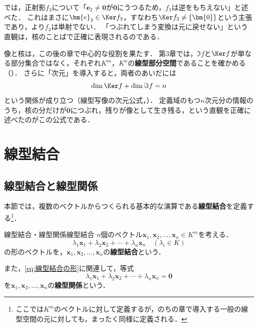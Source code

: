 では，正射影$f_3$について「$\bm{e}_2 \ne \bm{0}$が$\bm{0}$にうつるため，$f_3$は逆をもちえない」と述べた．
これはまさに$\bm{e}_2 \in \Ker f_3$，すなわち$\Ker f_3 \ne \{\bm{0}\}$という主張であり，より$f_3$は単射でない．
「つぶれてしまう変換は元に戻せない」という直観は，核のことばで正確に表現されるのである．

\begin{mycolumn}
  像と核は，この後の章で中心的な役割を果たす．
  第3章では，$\Im f$と$\Ker f$が単なる部分集合ではなく，それぞれ$K^m$，$K^n$の\textbf{線型部分空間}であることを確かめる（）．
  さらに「次元」を導入すると，両者のあいだには
  \[
    \dim \Ker f + \dim \Im f = n
  \]
  という関係が成り立つ（線型写像の次元公式，）．
  定義域のもつ$n$次元分の情報のうち，核の分だけが$\bm{0}$につぶれ，残りが像として生き残る，という直観を正確に述べたのがこの公式である．
\end{mycolumn}

\section{線型結合}

\subsection{線型結合と線型関係}

本節では，複数のベクトルからつくられる基本的な演算である\textbf{線型結合}を定義する\footnote{ここでは$K^m$のベクトルに対して定義するが，のちの章で導入する一般の線型空間の元に対しても，まったく同様に定義される．}．

\begin{definition}{線型結合・線型関係}{線型結合}
  $n$個のベクトル$\bm{x}_1, \bm{x}_2, \dots, \bm{x}_n \in K^m$を考える．
  \begin{equation}
    \lambda_1 \bm{x}_1 + \lambda_2 \bm{x}_2 + \cdots + \lambda_n \bm{x}_n
    \quad (\lambda_i \in K) \label{eq:線型結合の形}
  \end{equation}
  の形のベクトルを，$\bm{x}_1, \bm{x}_2, \dots, \bm{x}_n$の\textbf{線型結合}という．

  また，\eqref{eq:線型結合の形}に関連して，等式
  \[
    \lambda_1 \bm{x}_1 + \lambda_2 \bm{x}_2 + \cdots + \lambda_n \bm{x}_n = \bm{0}
  \]
  を$\bm{x}_1, \bm{x}_2, \dots, \bm{x}_n$の\textbf{線型関係}という．
\end{definition}


